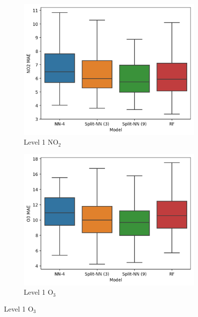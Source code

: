 \documentclass[journal abbreviation, manuscript]{copernicus}
\newcommand{\textus}[1]{$_{\text{#1}}$}
\begin{document}

\begin{figure}[H]
\centering
\begin{subfigure}{0.35\textwidth}
\includegraphics[width=\textwidth]{results/split-no2-location-level1-mae}
\caption{Level 1 NO\textus{2}}
\end{subfigure}
\begin{subfigure}{0.35\textwidth}
\includegraphics[width=\textwidth]{results/split-o3-location-level1-mae}
\caption{Level 1 O\textus{3}}

\end{subfigure}
\end{figure}
\end{document}
